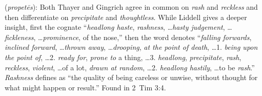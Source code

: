 \item[Rashness,]

(\textit{propetēs}):
Both Thayer and Gingrich agree in common on \emph{rash} and \emph{reckless} and then differentiate on \emph{precipitate} and \emph{thoughtless}. While Liddell gives a deeper insight, first the cognate  ``\emph{headlong haste}, \emph{rashness}, \ldots \emph{hasty judgement}, \ldots \emph{fickleness}, \ldots \emph{prominence}, of the nose,'' then the word denotes ``\emph{falling forwards}, \emph{inclined forward}, \ldots \emph{thrown away}, \ldots \emph{drooping}, \emph{at the point of death}, \ldots 1. \emph{being upon the point of}, \ldots 2. \emph{ready for}, \emph{prone to} a thing, \ldots 3. \emph{headlong}, \emph{precipitate}, \emph{rash}, \emph{reckless}, \emph{violent}, \ldots of a lot, \emph{drawn at random}, \ldots 2. \emph{headlong hastily}, \ldots to be \emph{rash}.'' 
\emph{Rashness} defines as ``the quality of being careless or unwise, without thought for what might happen or result.''
Found in 2~Tim 3:4.
